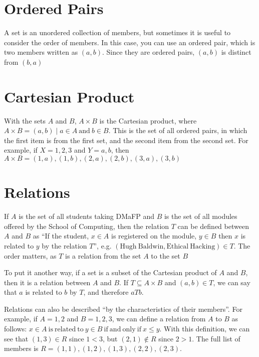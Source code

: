 
\section*{Ordered Pairs}

A set is an unordered collection of members, but sometimes it is useful to consider the order of members. In this
 case, you can use an ordered pair, which is two members written as $(a, b)$. Since they are ordered pairs, $(a, b)$ is
 distinct from $(b, a)$

\section*{Cartesian Product}

With the sets $A$ and $B$, $A \times B$ is the Cartesian product, where $A \times B = {(a, b) \mid a \in A \mathrm{\ and\ } b \in B}$.
This is the set of all ordered pairs, in which the first item is from the first set, and the second item from the second
 set. For example, if $X = {1, 2, 3}$ and $Y = {a, b}$, then
 $A \times B = {(1, a), (1, b), (2, a), (2, b), (3, a), (3, b)}$

\section*{Relations}

If $A$ is the set of all students taking DMaFP and $B$ is the set of all modules offered by the School of Computing,
 then the relation $T$ can be defined between $A$ and $B$ as ``If the student, $x \in A$ is registered on the module, 
 $y \in B$ then $x$ is related to $y$ by the relation $T$'', e.g.
 $(\mathrm{Hugh\ Baldwin}, \mathrm{Ethical\ Hacking}) \in T$. The order matters, as $T$ is a relation from the set $A$ to
 the set $B$

To put it another way, if a set is a subset of the Cartesian product of $A$ and $B$, then it is a relation between $A$
 and $B$. If $T \subseteq A \times B$ and $(a, b) \in T$, we can say that $a$ is related to $b$ by $T$, and therefore
 $aTb$.

Relations can also be described ``by the characteristics of their members''. For example, if $A = {1, 2}$ and
 $B = {1, 2, 3}$, we can define a relation from $A$ to $B$ as follows:
 $x \in A \mathrm{\ is\ related\ to\ } y \in B \mathrm{\ if\ and\ only\ if\ } x \leq y$. With this definition, we can
 see that $(1, 3) \in R$ since $1 < 3$, but $(2, 1) \notin R$ since $2 > 1$. The full list of members is
 $R = {(1, 1), (1, 2), (1, 3), (2, 2), (2, 3)}$.

